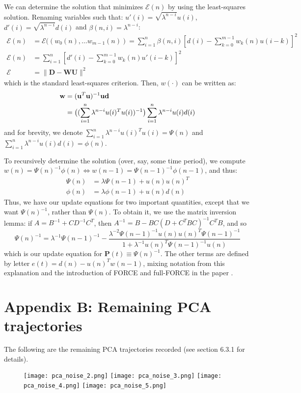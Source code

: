 \documentclass[12pt,a4paper,final]{iopart}
\begin{document}
We can determine the solution that minimizes $\mathcal{E}(n)$ by using the least-squares solution. Renaming variables such that: $u'(i) = \sqrt{\lambda^{n-i}}u(i)$, $d'(i) = \sqrt{\lambda^{n-i}}d(i)$ and $\beta(n,i) = \lambda^{n-i}$:
\begin{align*}
    \mathcal{E}(n) &= \mathcal{E}((w_0(n), \dots w_{m-1}(n)) = \sum_{i = 1}^n \beta(n, i)[d(i) - \sum_{k = 0}^{m - 1}w_k(n)u(i-k)]^2 \\
    \mathcal{E}(n) &= \sum_{i = 1}^n [d'(i) - \sum_{k=0}^{m-1}w_k(n)u'(i-k)]^2 \\
    \boldsymbol{\mathcal{E}} &= \lVert \boldsymbol{D} - \boldsymbol{W} \boldsymbol{U} \rVert ^2
\end{align*}
which is the standard least-squares criterion. Then, $w(\cdot)$ can be written as:
\begin{align*}
    {\bf w} &= ({\bf u}^T {\bf u})^{-1} {\bf u} {\bf d} \\
    &=\big((\sum_{i=1}^n\lambda^{n-i}u(i)^Tu(i))^{-1}\big)\sum_{i=1}^n\lambda^{n-i}u(i)d(i) 
\end{align*}
and for brevity, we denote $\sum_{i=1}^n\lambda^{n-i}u(i)^Tu(i) = \Psi(n)$ and $\sum_{i=1}^n\lambda^{n-i}u(i)d(i) = \phi(n)$.

To recursively determine the solution (over, say, some time period), we compute $w(n) = \Psi(n)^{-1}\phi(n) \Leftrightarrow w(n-1) = \Psi(n-1)^{-1}\phi(n-1)$, and thus:
\begin{align*}
    \Psi(n) &= \lambda \Psi(n-1) + u(n)u(n)^T \\
    \phi(n) &= \lambda \phi(n-1) + u(n)d(n)
\end{align*}
Thus, we have our update equations for two important quantities, except that we want $\Psi(n)^{-1}$, rather than $\Psi(n)$. To obtain it, we use the matrix inversion lemma: if $A = B^{-1} + CD^{-1}C^T$, then $A^{-1} = B - BC(D + C^TBC)^{-1}C^TB$, and so
\[
    \Psi(n)^{-1} = \lambda^{-1}\Psi(n-1)^{-1} - \frac{\lambda^{-2}\Psi(n-1)^{-1}u(n)u(n)^T\Psi(n-1)^{-1}}{1+\lambda^{-1} u(n)^T\Psi(n-1)^{-1}u(n)}
\]
which is our update equation for $\boldsymbol{P}(t) \equiv \Psi(n)^{-1}$. The other terms are defined by letter $e(t) = d(n) - u(n)^Tw(n-1)$, mixing notation from this explanation and the introduction of FORCE and full-FORCE in the paper \cite{Hayes}.

\newpage

\section*{Appendix B: Remaining PCA trajectories}
The following are the remaining PCA trajectories recorded (see section 6.3.1 for details).
\begin{figure}[h!]
    \centering
    \texttt{[image: pca\_noise\_2.png]}
    \texttt{[image: pca\_noise\_3.png]}
    \texttt{[image: pca\_noise\_4.png]}
    \texttt{[image: pca\_noise\_5.png]}
    \label{fig:my_label}
\end{figure}
\end{document}
